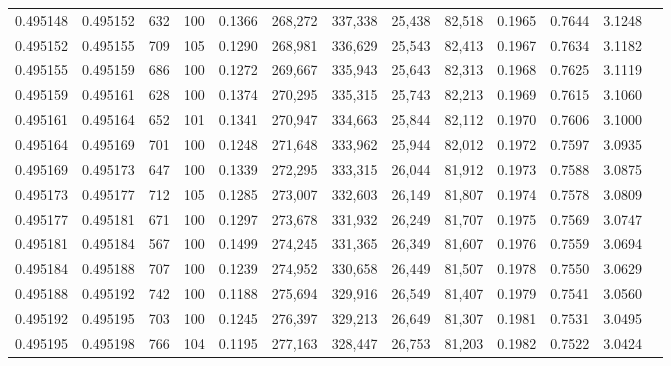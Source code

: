 \begin{tabular}{rrrrrrrrrrrrr}
0.495148 & 0.495152 &   632 & 100 &                                     0.1366 & 268,272 & 337,338 &  25,438 &  82,518 & 0.1965 & 0.7644 & 3.1248 \\
0.495152 & 0.495155 &   709 & 105 &                                     0.1290 & 268,981 & 336,629 &  25,543 &  82,413 & 0.1967 & 0.7634 & 3.1182 \\
0.495155 & 0.495159 &   686 & 100 &                                     0.1272 & 269,667 & 335,943 &  25,643 &  82,313 & 0.1968 & 0.7625 & 3.1119 \\
0.495159 & 0.495161 &   628 & 100 &                                     0.1374 & 270,295 & 335,315 &  25,743 &  82,213 & 0.1969 & 0.7615 & 3.1060 \\
0.495161 & 0.495164 &   652 & 101 &                                     0.1341 & 270,947 & 334,663 &  25,844 &  82,112 & 0.1970 & 0.7606 & 3.1000 \\
0.495164 & 0.495169 &   701 & 100 &                                     0.1248 & 271,648 & 333,962 &  25,944 &  82,012 & 0.1972 & 0.7597 & 3.0935 \\
0.495169 & 0.495173 &   647 & 100 &                                     0.1339 & 272,295 & 333,315 &  26,044 &  81,912 & 0.1973 & 0.7588 & 3.0875 \\
0.495173 & 0.495177 &   712 & 105 &                                     0.1285 & 273,007 & 332,603 &  26,149 &  81,807 & 0.1974 & 0.7578 & 3.0809 \\
0.495177 & 0.495181 &   671 & 100 &                                     0.1297 & 273,678 & 331,932 &  26,249 &  81,707 & 0.1975 & 0.7569 & 3.0747 \\
0.495181 & 0.495184 &   567 & 100 &                                     0.1499 & 274,245 & 331,365 &  26,349 &  81,607 & 0.1976 & 0.7559 & 3.0694 \\
0.495184 & 0.495188 &   707 & 100 &                                     0.1239 & 274,952 & 330,658 &  26,449 &  81,507 & 0.1978 & 0.7550 & 3.0629 \\
0.495188 & 0.495192 &   742 & 100 &                                     0.1188 & 275,694 & 329,916 &  26,549 &  81,407 & 0.1979 & 0.7541 & 3.0560 \\
0.495192 & 0.495195 &   703 & 100 &                                     0.1245 & 276,397 & 329,213 &  26,649 &  81,307 & 0.1981 & 0.7531 & 3.0495 \\
0.495195 & 0.495198 &   766 & 104 &                                     0.1195 & 277,163 & 328,447 &  26,753 &  81,203 & 0.1982 & 0.7522 & 3.0424 \\

\end{tabular}
